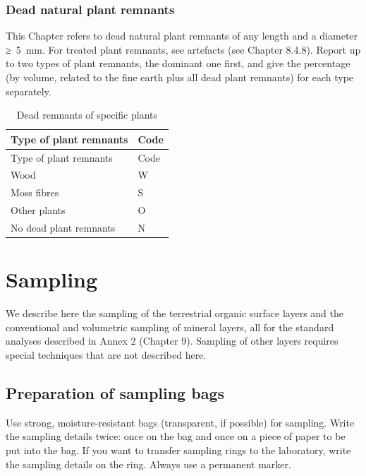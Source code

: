 \documentclass[
  letterpaper,
  DIV=11,
  numbers=noendperiod]{scrreprt}
\begin{document}
\hypertarget{dead-natural-plant-remnants}{%
\subsubsection{Dead natural plant
remnants}\label{dead-natural-plant-remnants}}

This Chapter refers to dead natural plant remnants of any length and a
diameter ≥~5~mm. For treated plant remnants, see artefacts (see Chapter
8.4.8). Report up to two types of plant remnants, the dominant one
first, and give the percentage (by volume, related to the fine earth
plus all dead plant remnants) for each type separately.

\begin{longtable}[]{@{}ll@{}}
\caption{Dead remnants of specific plants}\tabularnewline
\toprule()
Type of plant remnants & Code \\
\midrule()
\endfirsthead
\toprule()
Type of plant remnants & Code \\
\midrule()
\endhead
Wood & W \\
Moss fibres & S \\
Other plants & O \\
No dead plant remnants & N \\
\bottomrule()
\end{longtable}

\hypertarget{sampling}{%
\section{Sampling}\label{sampling}}

We describe here the sampling of the terrestrial organic surface layers
and the conventional and volumetric sampling of mineral layers, all for
the standard analyses described in Annex 2 (Chapter 9). Sampling of
other layers requires special techniques that are not described here.

\hypertarget{preparation-of-sampling-bags}{%
\subsection{Preparation of sampling
bags}\label{preparation-of-sampling-bags}}

Use strong, moisture-resistant bags (transparent, if possible) for
sampling. Write the sampling details twice: once on the bag and once on
a piece of paper to be put into the bag. If you want to transfer
sampling rings to the laboratory, write the sampling details on the
ring. Always use a permanent marker.
\end{document}
